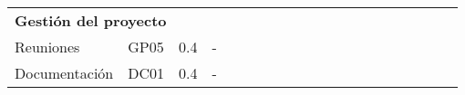 \begin{table}[H]
\begin{tabular}{|llcllllllllllllllll|l}
        \multicolumn{4}{|l|}{\textbf{Gestión del proyecto}}                                                                                                                                                                                                                                                  & \multicolumn{15}{l|}{}                                                                                                                                                                                                                                                                                                                                                                                                                                                                                               &  \\ \cline{1-19}
        \multicolumn{1}{|l|}{Reuniones}                                                                        & \multicolumn{1}{l|}{GP05}                              & \multicolumn{1}{c|}{0.4}                                 & \multicolumn{1}{l|}{-}                                                  &                                 &                                 &                                 & \cellcolor[HTML]{EF8787}        &                                 &                                 &                                 &                                 &                                 &                                 &                                 &                                 &                                 & \cellcolor[HTML]{EF8787}        &                          &  \\ \cline{1-4}
        \multicolumn{1}{|l|}{Documentación}                                                                    & \multicolumn{1}{l|}{DC01}                              & \multicolumn{1}{c|}{0.4}                                 & \multicolumn{1}{l|}{-}                                                  &                                 &                                 &                                 & \cellcolor[HTML]{C9C9C9}        & \cellcolor[HTML]{C9C9C9}        &                                 &                                 &                                 &                                 &                                 &                                 &                                 &                                 &                                 &                          &  \\ \cline{1-19}

\end{tabular}
\end{table}
